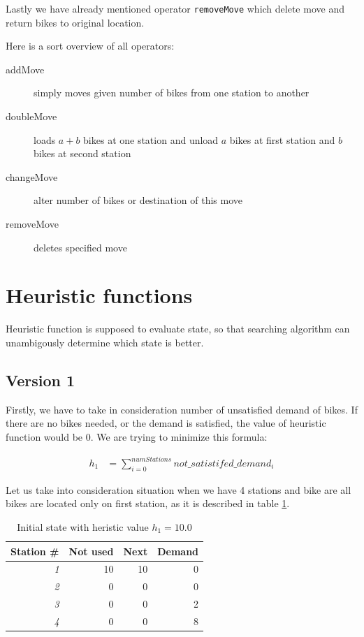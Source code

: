 \documentclass[11pt,twoside,a4paper]{mr}%
\begin{document}
Lastly we have already mentioned operator \texttt{removeMove} which delete move and return bikes to original location.

Here is a sort overview of all operators:
\begin{description}
 \item[addMove] simply moves given number of bikes from one station to another
\item[doubleMove] loads \( a + b \) bikes at one station and unload \(a\) bikes at first station and \(b\) bikes at second station
\item[changeMove] alter number of bikes or destination of this move
\item[removeMove] deletes specified move
 \end{description}

\section{Heuristic functions}
Heuristic function is supposed to evaluate state, so that searching algorithm can unambigously determine which state is better. 

\subsection*{Version 1}
Firstly, we have to take in consideration number of unsatisfied demand of bikes. If there are no bikes needed, or the demand is satisfied, the value of heuristic function would be 0. We are trying to minimize this formula: 

\begin{align}
 h_1 &=\sum\limits_{i=0}^{numStations} not\_satistifed\_demand_i
\end{align}

Let us take into consideration situation when we have 4 stations and bike are all bikes are located only on first station, as it is described in table \ref{t:ex1a}.


\begin{table}[!t]
\renewcommand{\arraystretch}{1.1}
\label{t:ex1a}
\begin{center}
\begin{tabular}[t]{|r|r|r|r|}
\hline
\bf Station \# & \bf Not used & \bf Next &\bf Demand\\ \hline\hline
\sl1 & 10 & 10 & 0\\ \hline
\sl2 & 0 & 0 & 0\\ \hline
\sl3 & 0 & 0 & 2\\ \hline
\sl4 & 0 & 0 & 8\\ \hline
\end{tabular}
\end{center}

\caption{Initial state with heristic value \(h_1= 10.0\)}
\end{table}
\end{document}
